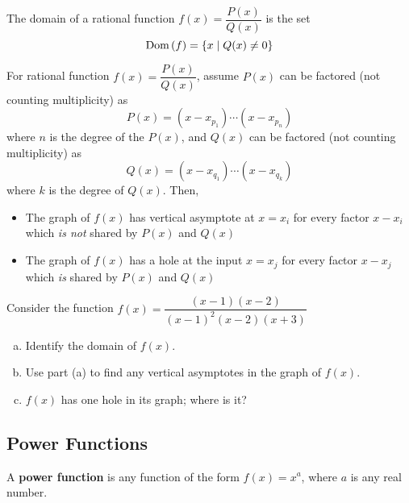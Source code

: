 \documentclass[notes]{subfiles}
\begin{document}
		\begin{rmk}
			The domain of a rational function \(f(x) = \dfrac{P(x)}{Q(x)}\) is the set
				\[\text{Dom}\,(f) = \left\lbrace x \mid Q(x)\neq 0 \right\rbrace\]
		\end{rmk}
			\newpage
			
		\begin{rmk}
			For rational function \(f(x) = \dfrac{P(x)}{Q(x)}\), assume \(P(x)\) can be factored (not counting multiplicity) as
				\[P(x) = (x-x_{p_1})\cdots (x-x_{p_n})\]
			where \(n\) is the degree of the \(P(x)\), and \(Q(x)\) can be factored (not counting multiplicity) as
				\[Q(x) = (x-x_{q_1})\cdots (x-x_{q_k})\]
			where \(k\) is the degree of \(Q(x)\).  Then,
			\begin{itemize}
				\item The graph of \(f(x)\) has vertical asymptote at \(x = x_i\) for every factor \(x-x_i\) which \emph{is not} shared by \(P(x)\) and \(Q(x)\)
				\item The graph of \(f(x)\) has a hole at the input \(x = x_j\) for every factor \(x-x_j\) which \emph{is} shared by \(P(x)\) and \(Q(x)\)
			\end{itemize}
		\end{rmk}
		
		\begin{ex}
			Consider the function \(f(x) = \dfrac{(x-1)(x-2)}{(x-1)^2(x-2)(x+3)}\)
			\begin{enumerate}[(a)]
				\item Identify the domain of \(f(x)\).
					
				\item Use part (a) to find any vertical asymptotes in the graph of \(f(x)\).
					
				\item \(f(x)\) has one hole in its graph; where is it?
					
			\end{enumerate}
		\end{ex}
			\newpage
			
	\subsection*{Power Functions}
		\begin{defn}
			A \textbf{power function} is any function of the form \(f(x) = x^a\), where \(a\) is any real number.
		\end{defn}
		
\end{document}
